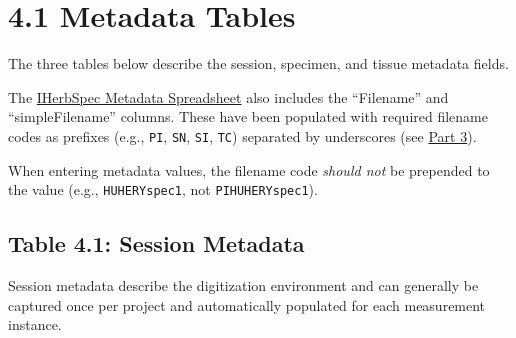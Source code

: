 \documentclass[
  letterpaper,
  DIV=11,
  numbers=noendperiod]{scrreprt}
\begin{document}
\section{4.1 Metadata Tables}\label{section4-1}

The three tables below describe the session, specimen, and tissue
metadata fields.

The \href{tables/IHerbSpec_metadata.csv}{IHerbSpec Metadata Spreadsheet}
also includes the ``Filename'' and ``simpleFilename'' columns. These
have been populated with required filename codes as prefixes (e.g.,
\texttt{PI}, \texttt{SN}, \texttt{SI}, \texttt{TC}) separated by
underscores (see \hyperref[part-3-filename-conventions-and-formats]{Part
3}).

When entering metadata values, the filename code \emph{should not} be
prepended to the value (e.g., \texttt{HUHERYspec1}, not
\texttt{PIHUHERYspec1}).

\subsection{Table 4.1: Session Metadata}\label{tbl-4-1}

Session metadata describe the digitization environment and can generally
be captured once per project and automatically populated for each
measurement instance.
\end{document}
